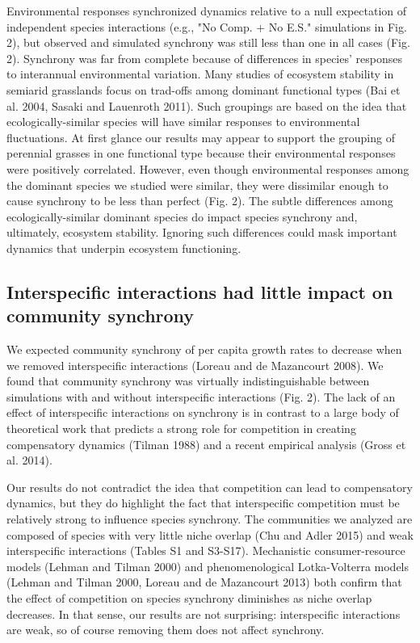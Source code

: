 \documentclass[12pt,]{article}
\begin{document}
Environmental responses synchronized dynamics relative to a null expectation of independent species interactions (e.g., "No Comp. + No E.S." simulations in Fig. 2), but observed and simulated synchrony was still less than one in all cases (Fig. 2).
Synchrony was far from complete because of differences in species' responses to interannual environmental variation.
Many studies of ecosystem stability in semiarid grasslands focus on trad-offs among dominant functional types
(Bai et al. 2004, Sasaki and Lauenroth 2011).
Such groupings are based on the idea that ecologically-similar species will have similar responses to environmental fluctuations.
At first glance our results may appear to support the grouping of perennial grasses in one functional type because their environmental responses were positively correlated.
However, even though environmental responses among the dominant species we studied were similar, they were dissimilar enough to cause synchrony to be less than perfect (Fig. 2).
The subtle differences among ecologically-similar dominant species do impact species synchrony and, ultimately, ecosystem stability.
Ignoring such differences could mask important dynamics that underpin ecosystem functioning.

\subsection{Interspecific interactions had little impact on community synchrony}

We expected community synchrony of per capita growth rates to decrease
when we removed interspecific interactions (Loreau and {{de Mazancourt}}
2008). We found that community synchrony was virtually indistinguishable
between simulations with and without interspecific interactions (Fig.
2). The lack of an effect of interspecific interactions on synchrony is
in contrast to a large body of theoretical work that predicts a strong
role for competition in creating compensatory dynamics (Tilman 1988) and
a recent empirical analysis (Gross et al. 2014).

Our results do not contradict the idea that competition can lead to
compensatory dynamics, but they do highlight the fact that interspecific
competition must be relatively strong to influence species synchrony.
The communities we analyzed are composed of species with very little
niche overlap (Chu and Adler 2015) and weak interspecific interactions
(Tables S1 and S3-S17). Mechanistic consumer-resource models (Lehman and
Tilman 2000) and phenomenological Lotka-Volterra models (Lehman and
Tilman 2000, Loreau and {{de Mazancourt}} 2013) both confirm that the
effect of competition on species synchrony diminishes as niche overlap
decreases. In that sense, our results are not surprising: interspecific
interactions are weak, so of course removing them does not affect
synchrony.
\end{document}
